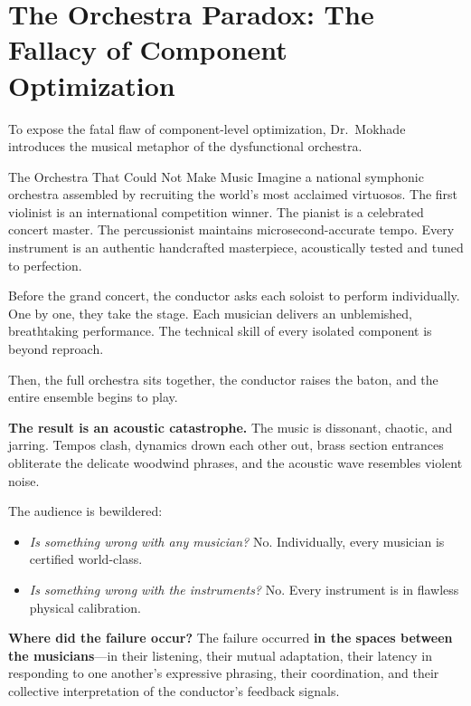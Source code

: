 \section{The Orchestra Paradox: The Fallacy of Component Optimization}
\label{sec:orchestra_paradox}

To expose the fatal flaw of component-level optimization, Dr.~Mokhade introduces the musical metaphor of the dysfunctional orchestra.

\begin{storybox}{The Orchestra That Could Not Make Music}
Imagine a national symphonic orchestra assembled by recruiting the world's most acclaimed virtuosos. The first violinist is an international competition winner. The pianist is a celebrated concert master. The percussionist maintains microsecond-accurate tempo. Every instrument is an authentic handcrafted masterpiece, acoustically tested and tuned to perfection.

Before the grand concert, the conductor asks each soloist to perform individually. One by one, they take the stage. Each musician delivers an unblemished, breathtaking performance. The technical skill of every isolated component is beyond reproach.

Then, the full orchestra sits together, the conductor raises the baton, and the entire ensemble begins to play.

\textbf{The result is an acoustic catastrophe.}
The music is dissonant, chaotic, and jarring. Tempos clash, dynamics drown each other out, brass section entrances obliterate the delicate woodwind phrases, and the acoustic wave resembles violent noise.

The audience is bewildered:
\begin{itemize}[leftmargin=1.5em]
    \item \textit{Is something wrong with any musician?} No. Individually, every musician is certified world-class.
    \item \textit{Is something wrong with the instruments?} No. Every instrument is in flawless physical calibration.
\end{itemize}

\textbf{Where did the failure occur?}
The failure occurred \textbf{in the spaces between the musicians}—in their listening, their mutual adaptation, their latency in responding to one another's expressive phrasing, their coordination, and their collective interpretation of the conductor's feedback signals.
\end{storybox}

